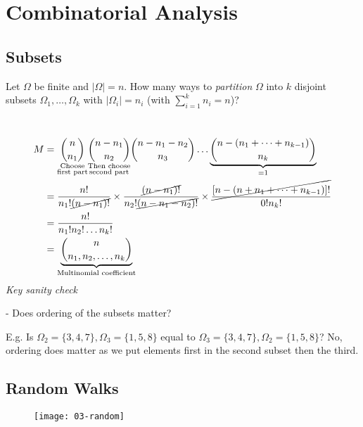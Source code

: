 \section{Combinatorial Analysis}
\subsection{Subsets}

\begin{question}
    Let $\Omega$ be finite and $|\Omega| = n$. How many ways to \emph{partition} $\Omega$ into $k$ disjoint subsets $\Omega_1, \dots, \Omega_k$ with $|\Omega_i| = n_i$ (with $\sum_{i=1}^{k} n_i = n$)?
\end{question} 

\begin{answer} ~\vspace*{-1.5\baselineskip}
    \begin{align*}
        M &= \underset{\substack{\text{Choose} \\ \text{first part}}}{\binom{n}{n_1}} \underset{\substack{\text{Then choose} \\ \text{second part}}}{\binom{n - n_1}{n_2}} \binom{n - n_1 - n_2}{n_3} \dots \underbrace{\binom{n - (n_1 + \dots + n_{k - 1})}{n_k}}_{= 1} \\
        &= \frac{n!}{n_1! \cancel{(n - n_1)!}} \times \frac{\cancel{(n - n_1)!}}{n_2! \cancel{(n - n_1 - n_2)!}} \times \frac{\cancel{[n - (n + n_1 + \dots + n_{k - 1})]!}}{0! n_k!} \\
        &= \frac{n!}{n_1! n_2! \dots n_k!} \\
        &= \underbrace{\binom{n}{n_1, n_2, \dots, n_k}}_{\text{Multinomial coefficient}}
    \end{align*} 
    \emph{Key sanity check}

    - Does ordering of the subsets matter?

    E.g. Is $\Omega_2 = \{3, 4, 7\}, \Omega_3 = \{1, 5, 8\}$ equal to $\Omega_3 = \{3, 4, 7\}, \Omega_2 = \{1, 5, 8\}$? 
    No, ordering does matter as we put elements first in the second subset then the third.
\end{answer} 

\subsection{Random Walks}

\begin{figure}[h] 
    \centering 
    \texttt{[image: 03-random]} 
\end{figure}

